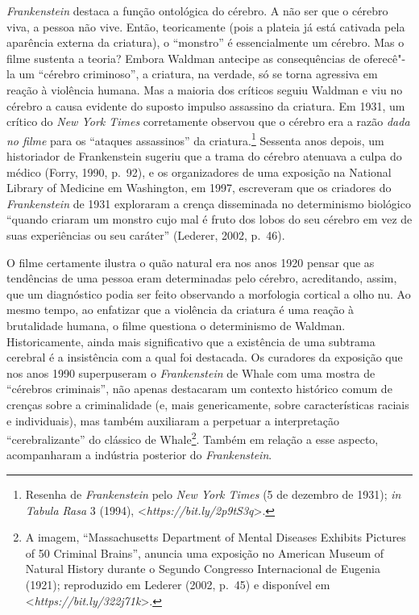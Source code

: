 \emph{Frankenstein} destaca a função ontológica do cérebro. A não ser
que o cérebro viva, a pessoa não vive. Então, teoricamente (pois a
plateia já está cativada pela aparência externa da criatura), o
``monstro'' é essencialmente um cérebro. Mas o filme sustenta a teoria?
Embora Waldman antecipe as consequências de oferecê"-la um ``cérebro
criminoso'', a criatura, na verdade, só se torna agressiva em reação à
violência humana. Mas a maioria dos críticos seguiu Waldman e viu no
cérebro a causa evidente do suposto impulso assassino da criatura. Em
1931, um crítico do \emph{New York Times} corretamente observou que o
cérebro era a razão \emph{dada no filme} para os ``ataques assassinos''
da criatura.\footnote[3]{Resenha de \emph{Frankenstein} pelo \emph{New York Times} (5 de
dezembro de 1931); \emph{in} \emph{Tabula Rasa} 3 (1994),
\textless{}\emph{https://bit.ly/2p9tS3q}\textgreater{}.} Sessenta anos depois, um historiador de
Frankenstein sugeriu que a trama do cérebro atenuava a culpa do médico
(Forry, 1990, p.~92), e os organizadores de uma exposição na National
Library of Medicine em Washington, em 1997, escreveram que os criadores
do \emph{Frankenstein} de 1931 exploraram a crença disseminada no
determinismo biológico ``quando criaram um monstro cujo mal é fruto dos
lobos do seu cérebro em vez de suas experiências ou seu caráter''
(Lederer, 2002, p.~46).

O filme certamente ilustra o quão natural era nos anos 1920 pensar que
as tendências de uma pessoa eram determinadas pelo cérebro, acreditando,
assim, que um diagnóstico podia ser feito observando a morfologia
cortical a olho nu. Ao mesmo tempo, ao enfatizar que a violência da
criatura é uma reação à brutalidade humana, o filme questiona o
determinismo de Waldman. Historicamente, ainda mais significativo que a
existência de uma subtrama cerebral é a insistência com a qual foi
destacada. Os curadores da exposição que nos anos 1990 superpuseram o
\emph{Frankenstein} de Whale com uma mostra de ``cérebros criminais'',
não apenas destacaram um contexto histórico comum de crenças sobre a
criminalidade (e, mais genericamente, sobre características raciais e
individuais), mas também auxiliaram a perpetuar a interpretação
``cerebralizante'' do clássico de Whale\footnote[4]{A imagem, ``Massachusetts Department of Mental Diseases Exhibits
Pictures of 50 Criminal Brains'', anuncia uma exposição no American
Museum of Natural History durante o Segundo Congresso Internacional de
Eugenia (1921); reproduzido em Lederer (2002, p.~45) e disponível em
\textless{}\emph{https://bit.ly/322j71k}\textgreater{}.}. Também em
relação a esse aspecto, acompanharam a indústria posterior do
\emph{Frankenstein}.


